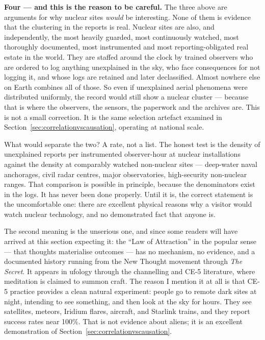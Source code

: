 \textbf{Four --- and this is the reason to be careful.} The three above are arguments for why
nuclear sites \emph{would} be interesting. None of them is evidence that the clustering in the
reports is real. Nuclear sites are also, and independently, the most heavily guarded, most
continuously watched, most thoroughly documented, most instrumented and most
reporting-obligated real estate in the world. They are staffed around the clock by trained
observers who are ordered to log anything unexplained in the sky, who face consequences for not
logging it, and whose logs are retained and later declassified. Almost nowhere else on Earth
combines all of those. So even if unexplained aerial phenomena were distributed uniformly, the
record would still show a nuclear cluster --- because that is where the observers, the sensors,
the paperwork and the archives are. This is not a small correction. It is the same selection
artefact examined in Section~\ref{sec:correlationvscausation}, operating at national scale.

What would separate the two? A rate, not a list. The honest test is the density of unexplained
reports per instrumented observer-hour at nuclear installations against the density at comparably
watched non-nuclear sites --- deep-water naval anchorages, civil radar centres, major
observatories, high-security non-nuclear ranges. That comparison is possible in principle, because
the denominators exist in the logs. It has never been done properly. Until it is, the correct
statement is the uncomfortable one: there are excellent physical reasons why a visitor would
watch nuclear technology, and no demonstrated fact that anyone is.


The second meaning is the unserious one, and since some readers will have arrived at this section
expecting it: the ``Law of Attraction'' in the popular sense --- that thoughts materialise
outcomes --- has no mechanism, no evidence, and a documented history running from the New Thought
movement through \emph{The Secret}. It appears in ufology through the channelling and CE-5
literature, where meditation is claimed to summon craft. The reason I mention it at all is that
CE-5 practice provides a clean natural experiment: people go to remote dark sites at night,
intending to see something, and then look at the sky for hours. They see satellites, meteors,
Iridium flares, aircraft, and Starlink trains, and they report success rates near 100\%. That is
not evidence about aliens; it is an excellent demonstration of Section~\ref{sec:correlationvscausation}.

